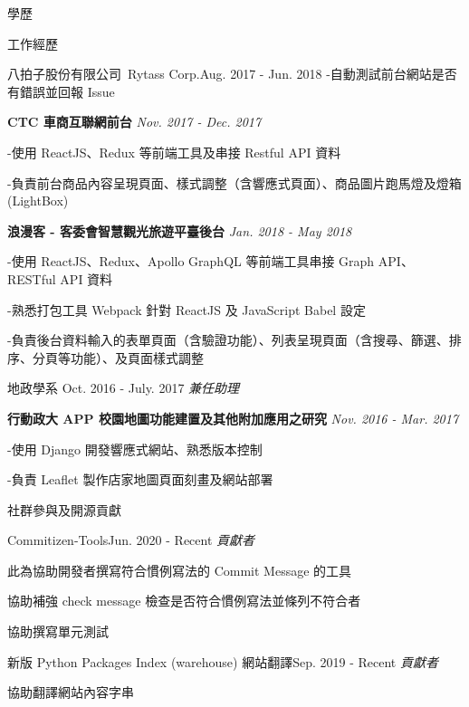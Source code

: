 \documentclass{resume} %
\begin{document}
\begin{rSection}{\Large 學歷}
\begin{rSection}{\Large 工作經歷}
\begin{rSubsection}{\large 八拍子股份有限公司\ Rytass Corp.}{Aug. 2017 - Jun. 2018}
{\quad \small -自動測試前台網站是否有錯誤並回報 Issue}

\medskip
\item {\bf {\small CTC} 車商互聯網前台} {\it  Nov. 2017 - Dec. 2017}


{\quad \small -使用 ReactJS、Redux 等前端工具及串接 Restful API 資料}

{\quad \small -負責前台商品內容呈現頁面、樣式調整（含響應式頁面）、商品圖片跑馬燈及燈箱(LightBox)}

\medskip

\item {\bf 浪漫客 - 客委會智慧觀光旅遊平臺後台} {\it  Jan. 2018 - May 2018}

{\quad \small -使用 ReactJS、Redux、Apollo GraphQL 等前端工具串接 Graph API、 RESTful API 資料}

{\quad \small -熟悉打包工具 Webpack 針對 ReactJS 及 JavaScript Babel 設定}

{\quad \small -負責後台資料輸入的表單頁面（含驗證功能）、列表呈現頁面（含搜尋、篩選、排序、分頁等功能）、及頁面樣式調整}
\end{rSubsection} 

\bigskip
\bigskip
\bigskip
\bigskip


\begin{rSubsection}{\large 地政學系 }{Oct. 2016 - July. 2017} 
{\it{兼任助理}}{}
\item \rm {\bf 行動政大 APP 校園地圖功能建置及其他附加應用之研究} {\it  Nov. 2016 - Mar. 2017}

{\quad \small -使用 Django 開發響應式網站、熟悉版本控制}

{\quad \small -負責 Leaflet 製作店家地圖頁面刻畫及網站部署}


\end{rSubsection} 
\end{rSection}

\begin{rSection}{\Large 社群參與及開源貢獻}

\begin{rSubsection}{\large Commitizen-Tools}{Jun. 2020 - Recent}
{\it{貢獻者}}{}
\item \rm 此為協助開發者撰寫符合慣例寫法的 Commit Message 的工具
\item \rm 協助補強 check  message 檢查是否符合慣例寫法並條列不符合者
\item \rm 協助撰寫單元測試
\smallskip
\end{rSubsection}

\begin{rSubsection}{\large 新版 Python Packages Index (warehouse) 網站翻譯}{Sep. 2019 - Recent}
{\it{貢獻者}}{}
\item \rm 協助翻譯網站內容字串
\smallskip
\end{rSubsection}


\end{rSection}
\end{rSection}
\end{document}
